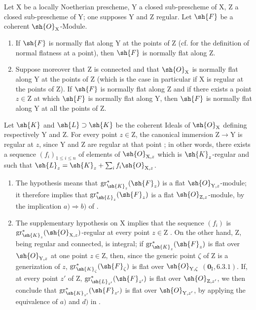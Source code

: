 \begin{corollary}[19.7.5]
\label{IV.19.7.5}
Let $\mathrm{X}$ be a locally Noetherian prescheme, $\mathrm{Y}$ a closed sub-prescheme of $\mathrm{X}$, $\mathrm{Z}$ a closed sub-prescheme of $\mathrm{Y}$; one supposes $\mathrm{Y}$ and $\mathrm{Z}$ regular. Let $\sh{F}$ be a coherent $\sh{O}_\mathrm{X}$-Module.
\begin{enumerate}
\item[\rm(i)] If $\sh{F}$ is normally flat along $\mathrm{Y}$ at the points of $\mathrm{Z}$ (cf.  for the definition of normal flatness at a point), then $\sh{F}$ is normally flat along $\mathrm{Z}$.
\item[\rm(ii)] Suppose moreover that $\mathrm{Z}$ is connected and that $\sh{O}_\mathrm{X}$ is normally flat along $\mathrm{Y}$ at the points of $\mathrm{Z}$ (which is the case in particular if $\mathrm{X}$ is regular at the points of $\mathrm{Z}$). If $\sh{F}$ is normally flat along $\mathrm{Z}$ and if there exists a point $z\in\mathrm{Z}$ at which $\sh{F}$ is normally flat along $\mathrm{Y}$, then $\sh{F}$ is normally flat along $\mathrm{Y}$ at all the points of $\mathrm{Z}$.
\end{enumerate}

Let $\sh{K}$ and $\sh{L}\supset\sh{K}$ be the coherent Ideals of $\sh{O}_\mathrm{X}$ defining respectively $\mathrm{Y}$ and $\mathrm{Z}$. For every point $z\in\mathrm{Z}$, the canonical immersion $\mathrm{Z}\to\mathrm{Y}$ is regular at $z$, since $\mathrm{Y}$ and $\mathrm{Z}$ are regular at that point ; in other words, there exists a sequence $(f_i)_{1\leqslant i\leqslant n}$ of elements of $\sh{O}_{\mathrm{X},z}$ which is $\sh{K}_z$-regular and such that $\sh{L}_z=\sh{K}_z+\sum_i f_i\sh{O}_{\mathrm{X},z}$.
\begin{enumerate}
\item[\rm(i)] The hypothesis means that $\operatorname{gr}_{\sh{K}_z}^*(\sh{F}_z)$ is a flat $\sh{O}_{\mathrm{Y},z}$-module; it therefore implies that $\operatorname{gr}_{\sh{L}_z}^*(\sh{F}_z)$ is a flat $\sh{O}_{\mathrm{Z},z}$-module, by the implication $a)\Rightarrow b)$ of .
\item[\rm(ii)] The supplementary hypothesis on $\mathrm{X}$ implies that the sequence $(f_i)$ is $\operatorname{gr}_{\sh{K}_z}^*(\sh{O}_{\mathrm{X},z})$-regular at every point $z\in\mathrm{Z}$ . On the other hand, $\mathrm{Z}$, being regular and connected, is integral; if $\operatorname{gr}_{\sh{K}_z}^*(\sh{F}_z)$ is flat over $\sh{O}_{\mathrm{Y},z}$ at one point $z\in\mathrm{Z}$, then, since the generic point $\zeta$ of $\mathrm{Z}$ is a generization of $z$, $\operatorname{gr}_{\sh{K}_\zeta}^*(\sh{F}_\zeta)$ is flat over $\sh{O}_{\mathrm{Y},\zeta}$ $(\mathbf{0}_\mathrm{I},6.3.1)$. If, at every point $z'$ of $\mathrm{Z}$, $\operatorname{gr}_{\sh{L}_{z'}}^*(\sh{F}_{z'})$ is flat over $\sh{O}_{\mathrm{Z},z'}$, we then conclude that $\operatorname{gr}_{\sh{K}_{z'}}^*(\sh{F}_{z'})$ is flat over $\sh{O}_{\mathrm{Y},z'}$, by applying the equivalence of $a)$ and $d)$ in .
\end{enumerate}
\end{corollary}

